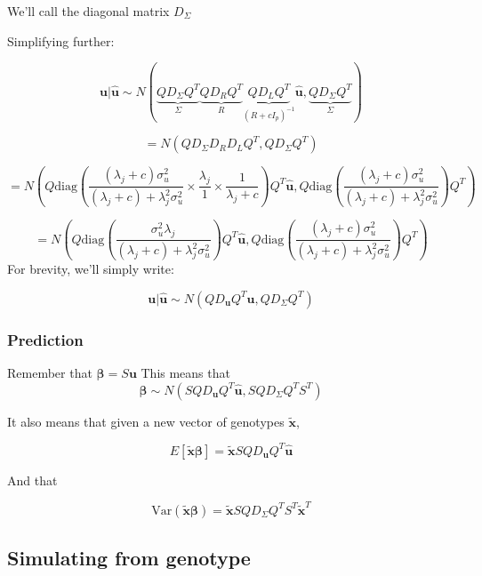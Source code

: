 We'll call the diagonal matrix \(D_\Sigma\)

Simplifying further:

$$\textbf{u}|\hat{\textbf{u}} \sim N(\underbrace{Q D_\Sigma Q^{T}}_\Sigma \underbrace{QD_{R}Q^{T}}_R \underbrace{QD_LQ^{T}}_{(R+cI_p)^{-1}}\hat{\textbf{u}},\underbrace{QD_\Sigma Q^{T}}_\Sigma)$$

$$= N(QD_\Sigma D_R D_LQ^{T},QD_\Sigma Q^{T})$$

$$= N\left( Q \text{diag}\left( \frac{(\lambda_j+c)\sigma_u^2}{(\lambda_j+c)+\lambda_j^2\sigma_u^2} \times \frac{\lambda_j}{1} \times \frac{1}{\lambda_j+c} \right)Q^{T}\hat{\textbf{u}},Q \text{diag}\left(\frac{(\lambda_j+c)\sigma_u^2}{(\lambda_j+c)+\lambda_j^2\sigma_u^2} \right)Q^{T} \right)$$

$$= N\left( Q \text{diag}\left( \frac{\sigma_u^2 \lambda_j}{(\lambda_j+c)+\lambda_j^2\sigma_u^2}  \right)Q^{T}\hat{\textbf{u}},Q \text{diag}\left(\frac{(\lambda_j+c)\sigma_u^2}{(\lambda_j+c)+\lambda_j^2\sigma_u^2} \right)Q^{T} \right)$$
For brevity, we'll simply write:

$$\textbf{u}|\hat{\textbf{u}} \sim N \left(Q D_{\textbf{u}}Q^{T}\hat{\textbf{u}},QD_{\Sigma}Q^{T}\right)$$




\subsubsection{Prediction}\label{sec:org8cfb0b1}

Remember that \(\boldsymbol{\beta}=S\textbf{u}\) This means that 
$$\boldsymbol{\beta} \sim N( SQD_{\textbf{u}}Q^{T}\hat{\textbf{u}},SQD_\Sigma Q^{T}S^{T})$$

It also means that given a new vector of genotypes \(\tilde{\textbf{x}}\),

$$E[\tilde{\textbf{x}}\boldsymbol{\beta}]=\tilde{\textbf{x}}SQD_\textbf{u}Q^{T}\hat{\textbf{u}}$$

And that 

$$\text{Var}(\tilde{\textbf{x}}\boldsymbol{\beta})=\tilde{\textbf{x}}SQD_\Sigma Q^{T}S^{T}\tilde{\textbf{x}}^{T}$$








\subsection{Simulating from genotype}\label{sec:orgaeeeb37}

